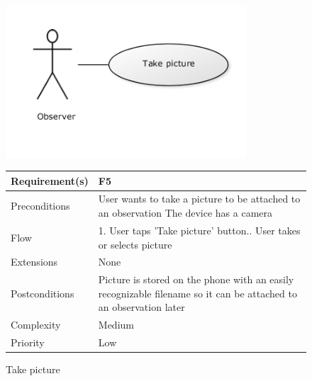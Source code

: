 \begin{figure}[!htb]
		\centering
		\includegraphics[width=0.8\textwidth]{reqspec/uc/takepicture.png}
		\caption{Take picture}
		\label{fig:takepicture}

\begin{tabular}[t]{|l|p{}|}\hline
	Requirement(s)&F5\\\hline
	Preconditions&User wants to take a picture to be attached to an observation\newline
	The device has a camera\\\hline
	Flow&1. User taps 'Take picture' button.\newline
	2. User takes or selects picture \\\hline
	Extensions&None\\\hline
	Postconditions&Picture is stored on the phone with an easily recognizable filename so it can be attached to an observation 	later\\\hline
	Complexity&Medium\\\hline
	Priority&Low\\\hline
\end{tabular}
\end{figure}


\clearpage



